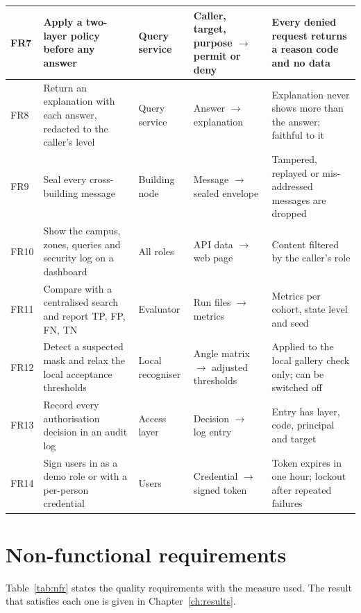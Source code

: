 \documentclass[12pt,a4paper,oneside]{report}
\begin{document}
{\begin{longtable}{|p{0.93cm}|p{3.75cm}|p{1.87cm}|p{3.19cm}|p{3.94cm}|}
FR7 & Apply a two-layer policy before any answer & Query service & Caller, target, purpose $\rightarrow$ permit or deny & Every denied request returns a reason code and no data\\\hline
FR8 & Return an explanation with each answer, redacted to the caller's level & Query service & Answer $\rightarrow$ explanation & Explanation never shows more than the answer; faithful to it\\\hline
FR9 & Seal every cross-building message & Building node & Message $\rightarrow$ sealed envelope & Tampered, replayed or mis-addressed messages are dropped\\\hline
FR10 & Show the campus, zones, queries and security log on a dashboard & All roles & API data $\rightarrow$ web page & Content filtered by the caller's role\\\hline
FR11 & Compare with a centralised search and report TP, FP, FN, TN & Evaluator & Run files $\rightarrow$ metrics & Metrics per cohort, state level and seed\\\hline
FR12 & Detect a suspected mask and relax the local acceptance thresholds & Local recogniser & Angle matrix $\rightarrow$ adjusted thresholds & Applied to the local gallery check only; can be switched off\\\hline
FR13 & Record every authorisation decision in an audit log & Access layer & Decision $\rightarrow$ log entry & Entry has layer, code, principal and target\\\hline
FR14 & Sign users in as a demo role or with a per-person credential & Users & Credential $\rightarrow$ signed token & Token expires in one hour; lockout after repeated failures\\\hline
\end{longtable}}


\section{Non-functional requirements}
Table~\ref{tab:nfr} states the quality requirements with the measure used. The result that satisfies each one is given in Chapter~\ref{ch:results}.
\end{document}
